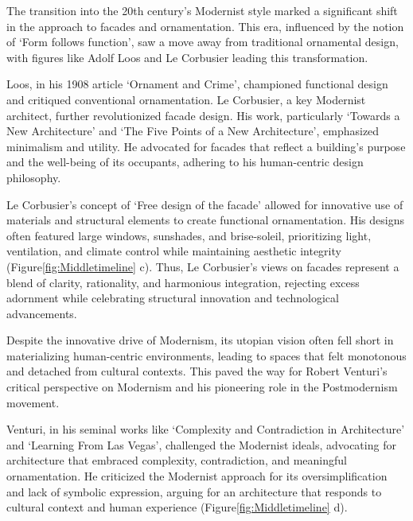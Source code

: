 
The transition into the 20th century's Modernist style marked a significant shift in the approach to facades and ornamentation.
This era, influenced by the notion of `Form follows function', saw a move away from traditional ornamental design, with figures like Adolf Loos and Le Corbusier leading this transformation.

Loos, in his 1908 article `Ornament and Crime', championed functional design and critiqued conventional ornamentation\cite{Saglam2014}.
Le Corbusier, a key Modernist architect, further revolutionized facade design.
His work, particularly `Towards a New Architecture'\cite{Studio2a2023} and `The Five Points of a New Architecture', emphasized minimalism and utility.
He advocated for facades that reflect a building's purpose and the well-being of its occupants, adhering to his human-centric design philosophy\cite{Virseda2021}.

Le Corbusier's concept of `Free design of the facade'\cite{Corbusier1986} allowed for innovative use of materials and structural elements to create functional ornamentation.
His designs often featured large windows, sunshades, and brise-soleil, prioritizing light, ventilation, and climate control while maintaining aesthetic integrity (Figure\ref{fig:Middletimeline} c).
Thus, Le Corbusier's views on facades represent a blend of clarity, rationality, and harmonious integration, rejecting excess adornment while celebrating structural innovation and technological advancements.


Despite the innovative drive of Modernism, its utopian vision often fell short in materializing human-centric environments, leading to spaces that felt monotonous and detached from cultural contexts.
This paved the way for Robert Venturi's critical perspective on Modernism and his pioneering role in the Postmodernism movement.

Venturi, in his seminal works like `Complexity and Contradiction in Architecture' and `Learning From Las Vegas', challenged the Modernist ideals, advocating for architecture that embraced complexity, contradiction, and meaningful ornamentation\cite{Venturi1972, Venturi1977}.
He criticized the Modernist approach for its oversimplification and lack of symbolic expression, arguing for an architecture that responds to cultural context and human experience (Figure\ref{fig:Middletimeline} d).

